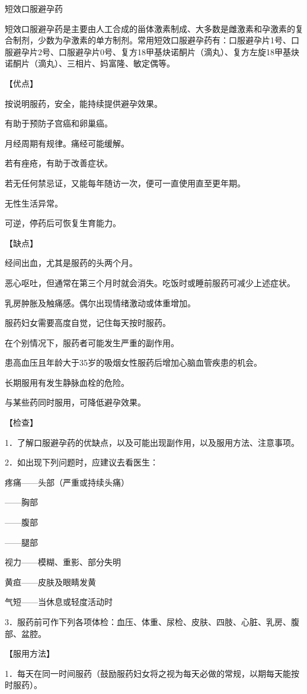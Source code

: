\documentclass[12pt,UTF8]{ctexbook}
\begin{document}
短效口服避孕药


短效口服避孕药是主要由人工合成的甾体激素制成、大多数是雌激素和孕激素的复合制剂，少数为孕激素的单方制剂。常用短效口服避孕药有：口服避孕片1号、口服避孕片2号、口服避孕片0号、复方18甲基炔诺酮片（滴丸）、复方左旋18甲基炔诺酮片（滴丸）、三相片、妈富隆、敏定偶等。

【优点】

按说明服药，安全，能持续提供避孕效果。

有助于预防子宫癌和卵巢癌。

月经周期有规律。痛经可能缓解。

若有痤疮，有助于改善症状。

若无任何禁忌证，又能每年随访一次，便可一直使用直至更年期。

无性生活异常。

可逆，停药后可恢复生育能力。

【缺点】

经间出血，尤其是服药的头两个月。

恶心呕吐，但通常在第三个月时就会消失。吃饭时或睡前服药可减少上述症状。

乳房肿胀及触痛感。偶尔出现情绪激动或体重增加。

服药妇女需要高度自觉，记住每天按时服药。

在个别情况下，服药者可能发生严重的副作用。

患高血压且年龄大于35岁的吸烟女性服药后增加心脑血管疾患的机会。

长期服用有发生静脉血栓的危险。

与某些药同时服用，可降低避孕效果。

【检查】

1．了解口服避孕药的优缺点，以及可能出现副作用，以及服用方法、注意事项。

2．如出现下列问题时，应建议去看医生：

疼痛——头部（严重或持续头痛）

——胸部

——腹部

——腿部

视力——模糊、重影、部分失明

黄疸——皮肤及眼睛发黄

气短——当休息或轻度活动时

3．服药前可作下列各项体检：血压、体重、尿检、皮肤、四肢、心脏、乳房、腹部、盆腔。

【服用方法】

1．每天在同一时间服药（鼓励服药妇女将之视为每天必做的常规，以期每天能按时服药）。
\end{document}
